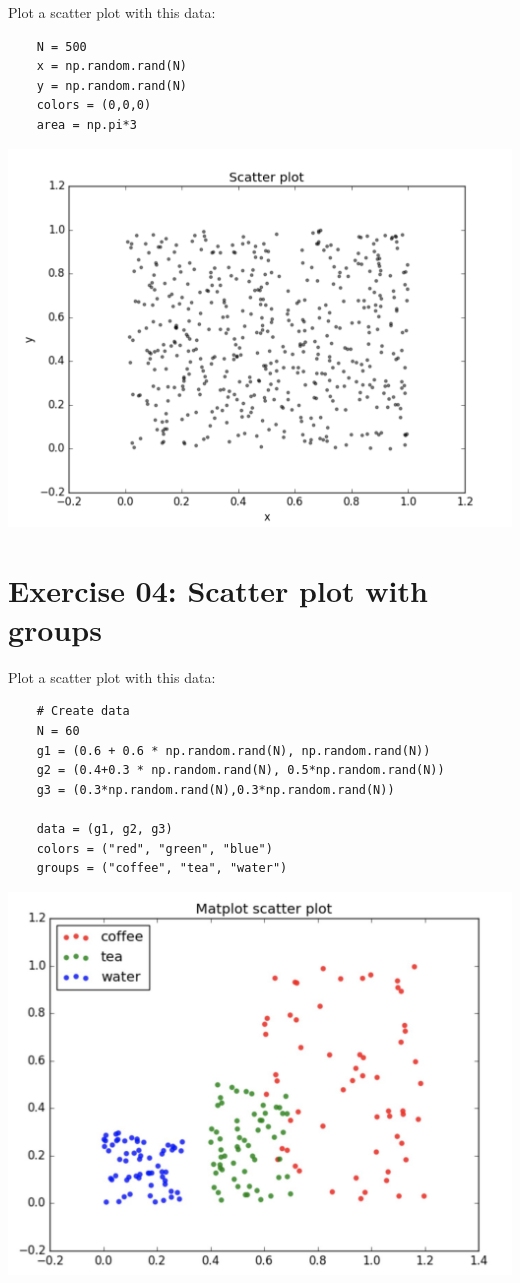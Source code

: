 \documentclass{42-en}
\begin{document}
Plot a scatter plot with this data:\\

\begin{lstlisting}
    N = 500
    x = np.random.rand(N)
    y = np.random.rand(N)
    colors = (0,0,0)
    area = np.pi*3
\end{lstlisting}

\centerline{\includegraphics[width=150mm]{images/bw_scatter.png}}

\nextexercice
\newpage



\chapter{Exercise 04:  Scatter plot with groups}
\makeheaderfiles

Plot a scatter plot with this data:\\

\begin{lstlisting}
    # Create data
    N = 60
    g1 = (0.6 + 0.6 * np.random.rand(N), np.random.rand(N))
    g2 = (0.4+0.3 * np.random.rand(N), 0.5*np.random.rand(N))
    g3 = (0.3*np.random.rand(N),0.3*np.random.rand(N))

    data = (g1, g2, g3)
    colors = ("red", "green", "blue")
    groups = ("coffee", "tea", "water")
\end{lstlisting}

\centerline{\includegraphics[width=150mm]{images/color_scatter.png}}
\end{document}
